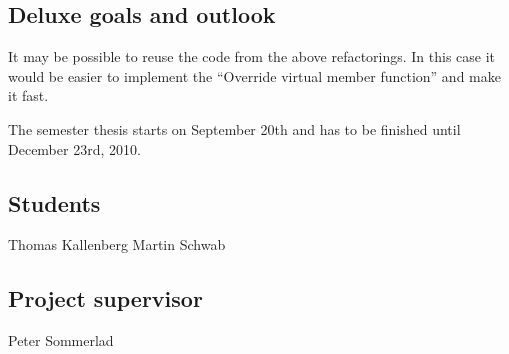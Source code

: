\documentclass[a4paper,10pt]{scrreprt}
\begin{document}
\subsection*{Deluxe goals and outlook}
It may be possible to reuse the code from the above refactorings. In this case it would be easier to implement the ``Override virtual member function'' and make it fast. \newline

The semester thesis starts on September 20th and has to be finished until
December 23rd, 2010.

\subsection*{Students}
Thomas Kallenberg \dotfill
Martin Schwab \dotfill
\subsection*{Project supervisor}
Peter Sommerlad \dotfill
~ \newline 
\end{document}
